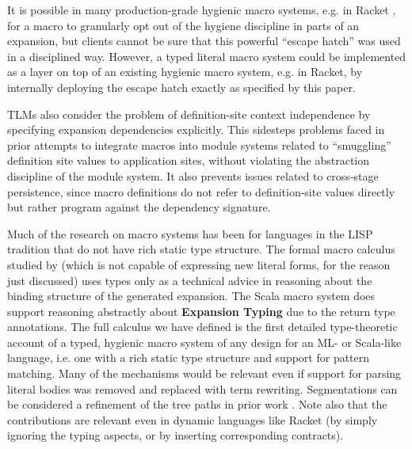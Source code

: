 \documentclass[acmsmall]{acmart}
\newcommand{\li}[1]{\lstinline[basicstyle=\ttfamily\fontsize{9pt}{1em}\selectfont]{#1}}
\begin{document}

It is  possible in many production-grade hygienic macro systems, e.g. in Racket \cite{Flatt:2012:CLR:2063176.2063195}, for a macro to granularly opt out of the hygiene discipline in parts of an expansion, but clients cannot be sure that this powerful ``escape hatch'' was used in a disciplined way. However, a typed literal macro system could be implemented as a layer on top of an existing hygienic macro system, e.g. in Racket, by internally deploying the escape hatch exactly as specified by this paper. %


TLMs also consider the problem of definition-site context independence by specifying expansion dependencies explicitly. This sidesteps problems faced in prior attempts to integrate macros into module systems \cite{culpepper2005syntactic} related to ``smuggling'' definition site values to application sites, without violating the abstraction discipline of the module system. It also prevents issues related to cross-stage persistence, since macro definitions do not refer to definition-site values directly but rather program against the dependency signature.

Much of the research on macro systems has been for languages in the LISP tradition \cite{mccarthy1978history} that do not have rich static type structure. The formal macro calculus studied by \citet{DBLP:conf/esop/HermanW08} (which is not capable of expressing new literal forms, for the reason just discussed) uses types only as a technical advice in reasoning about the binding structure of the generated expansion. The Scala macro system does support reasoning abstractly about \textbf{Expansion Typing} due to the return type annotations. The full calculus we have defined is the first detailed type-theoretic account of a typed, hygienic macro system of any design for an ML- or Scala-like language, i.e. one with a rich static type structure and support for pattern matching. Many of the mechanisms would be relevant even if support for parsing literal bodies was removed and replaced with term rewriting. Segmentations can be considered a refinement of the tree paths in prior work \cite{Herman10:Theory,gorn1965explicit}.  Note also that the contributions are relevant even in dynamic languages like Racket 
(by simply ignoring the typing aspects, or by inserting corresponding 
contracts).
\end{document}
